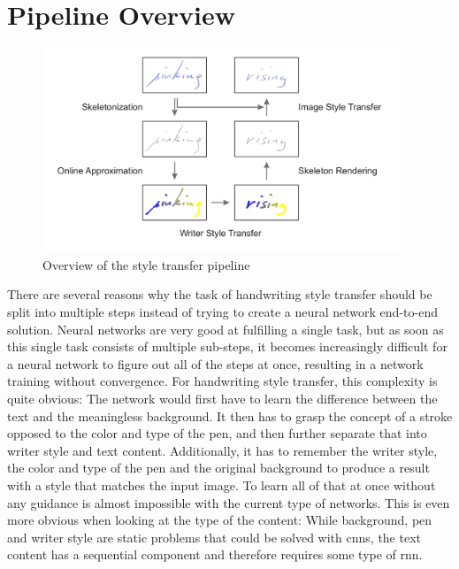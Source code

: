 \chapter{Pipeline Overview}\label{chapter:pipelineoverview}

\begin{figure}
  \centering
  
  \includegraphics[width=0.95\textwidth]{../assets/pipeline.pdf}
  
  \caption[Overview of the style transfer pipeline]{Overview of the style transfer pipeline}
  \label{fig:styleTransferPipelineOverview}
\end{figure}


There are several reasons why the task of handwriting style transfer should be split into multiple steps instead of trying to create a neural network end-to-end solution. Neural networks are very good at fulfilling a single task, but as soon as this single task consists of multiple sub-steps, it becomes increasingly difficult for a neural network to figure out all of the steps at once, resulting in a network training without convergence. For handwriting style transfer, this complexity is quite obvious: The network would first have to learn the difference between the text and the meaningless background. It then has to grasp the concept of a stroke opposed to the color and type of the pen, and then further separate that into writer style and text content. Additionally, it has to remember the writer style, the color and type of the pen and the original background to produce a result with a style that matches the input image. To learn all of that at once without any guidance is almost impossible with the current type of networks. This is even more obvious when looking at the type of the content: While background, pen and writer style are static problems that could be solved with \glspl{cnn}, the text content has a sequential component and therefore requires some type of \gls{rnn}.

